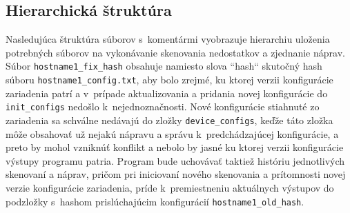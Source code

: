 \subsection*{Hierarchická štruktúra}
Nasledujúca štruktúra súborov s~komentármi vyobrazuje hierarchiu uloženia potrebných súborov na vykonávanie skenovania nedostatkov a zjednanie náprav. Súbor \texttt{hostname1\_fix\_hash} obsahuje namiesto slova ``hash`` skutočný hash súboru \texttt{hostname1\_config.txt}, aby bolo zrejmé, ku ktorej verzii konfigurácie zariadenia patrí a v~prípade aktualizovania a pridania novej konfigurácie do \texttt{init\_configs} nedošlo k~nejednoznačnosti. Nové konfigurácie stiahnuté zo zariadenia sa schválne nedávajú do zložky \texttt{device\_configs}, keďže táto zložka môže obsahovať už nejakú nápravu a správu k~predchádzajúcej konfigurácie, a preto by mohol vzniknúť konflikt a nebolo by jasné ku ktorej verzii konfigurácie  výstupy programu patria. Program bude uchovávať taktiež históriu jednotlivých skenovaní a náprav, pričom pri iniciovaní nového skenovania a prítomnosti novej verzie konfigurácie zariadenia, príde k~premiestneniu aktuálnych výstupov do podzložky s~hashom prislúchajúcim konfigurácií \texttt{hostname1\_old\_hash}. 


